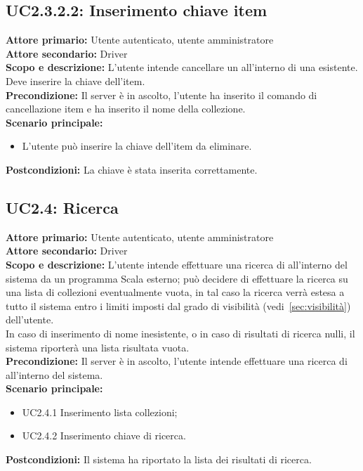 \documentclass{scalatekids-article}
\begin{document}
\subsection{UC2.3.2.2: Inserimento chiave item}

\textbf{Attore primario:} Utente autenticato, utente amministratore\\
\textbf{Attore secondario:} Driver\\
\textbf{Scopo e descrizione:} L'utente intende cancellare un  all'interno di una  esistente. Deve inserire la chiave dell'item.\\
\textbf{Precondizione:} Il server è in ascolto, l'utente ha inserito il comando di cancellazione item e ha inserito il nome della collezione.\\
\textbf{Scenario principale:}
\begin{itemize}
\item L'utente può inserire la chiave dell'item da eliminare.
\end{itemize}
\textbf{Postcondizioni:} La chiave è stata inserita correttamente.

\subsection{UC2.4: Ricerca}

\textbf{Attore primario:} Utente autenticato, utente amministratore\\
\textbf{Attore secondario:} Driver\\
\textbf{Scopo e descrizione:} L'utente intende effettuare una ricerca di  all'interno del sistema da un programma Scala esterno; può decidere di effettuare la ricerca su una lista di collezioni eventualmente vuota, in tal caso la
ricerca verrà estesa a tutto il sistema entro i limiti imposti dal grado di visibilità (vedi~\ref{sec:visibilità}) dell'utente.\\
In caso di inserimento di nome  inesistente, o in caso di risultati di ricerca nulli, il sistema riporterà una lista risultata vuota.\\ %
\textbf{Precondizione:} Il server è in ascolto, l'utente intende effettuare una ricerca di  all'interno del sistema.\\
\textbf{Scenario principale:}
\begin{itemize}
\item UC2.4.1 Inserimento lista collezioni;
\item UC2.4.2 Inserimento chiave di ricerca.
\end{itemize}
\textbf{Postcondizioni:} Il sistema ha riportato la lista dei risultati di ricerca.
\end{document}
